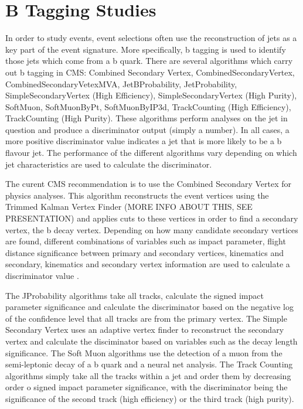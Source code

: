 \chapter{B Tagging Studies}
\label{c:b_tagging_studies}

In order to study \ttbar events, event selections often use the reconstruction of jets as a key part of the
event signature. More specifically, b tagging is used to identify those jets which come from a b quark. There
are several algorithms which carry out b tagging in CMS: Combined Secondary Vertex, CombinedSecondaryVertex,
CombinedSecondaryVetexMVA, JetBProbability, JetProbability, SimpleSecondaryVertex (High Efficiency),
SimpleSecondaryVertex (High Purity), SoftMuon, SoftMuonByPt, SoftMuonByIP3d, TrackCounting (High Efficiency),
TrackCounting (High Purity). These algorithms perform analyses on the jet in question and produce a
discriminator output (simply a number). In all cases, a more positive discriminator value indicates a jet that
is more likely to be a b flavour jet. The performance of the different algorithms vary depending on which jet
characteristics are used to calculate the discriminator.


The curent CMS recommendation is to use the Combined Secondary Vertex for physics analyses. This algorithm
reconstructs the event vertices using the Trimmed Kalman Vertex Finder (MORE INFO ABOUT THIS, SEE
PRESENTATION) and applies cuts to these vertices in order to find a secondary vertex, the b decay vertex.
Depending on how many candidate secondary vertices are found, different combinations of variables such as
impact parameter, flight distance significance between primary and secondary vertices, kinematics and
secondary, kinematics and secondary vertex information are used to calculate a discriminator value \cite{CSV}.

The JProbability algorithms take all tracks, calculate the signed impact parameter significance and calculate
the discriminator based on the negative log of the confidence level that all tracks are from the primary
vertex. The Simple Secondary Vertex uses an adaptive vertex finder to reconstruct the secondary vertex and
calculate the disciminator based on variables such as the decay length significance. The Soft Muon algorithms
use the detection of a muon from the semi-leptonic decay of a b quark and a neural net analysis. The Track
Counting algorithms simply take all the tracks within a jet and order them by decreasing order o signed impact
parameter significance, with the discriminator being the significance of the second track (high efficiency) or
the third track (high purity).

